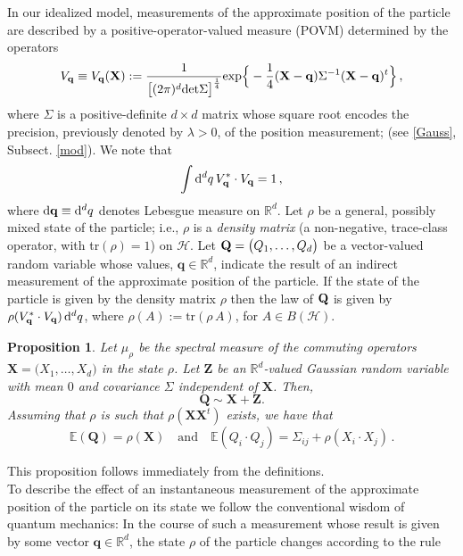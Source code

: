 \documentclass[11pt]{article}
\newtheorem{proposition}[theorem]{Proposition}
\renewcommand{\d}{{\mathrm d}}
\begin{document}
In our idealized model, measurements of the approximate position of the particle are described by a 
positive-operator-valued measure (POVM) determined by the operators
\begin{equation}\label{POVM1}
V_{\bf{q}}\equiv V_{\mathbf{q}}(\mathbf{X})  := \frac{1}{\big[(2\pi)^{d} \text{det}\Sigma\big]^{\frac{1}{4}}} \text{exp}\Big\{-\frac{1}{4}({\bf{X}}-{\bf{q}}) \Sigma^{-1}({\bf{X}}- {\bf{q}})^{t} \Big\}  \,,
\end{equation}
where $\Sigma$ is a positive-definite $d\times d$ matrix whose square root encodes the precision, previously denoted by $\lambda > 0$, of the position measurement; (see \eqref{Gauss}, Subsect. \ref{mod}).
We note that 
\begin{equation}\label{POVM}
\int \d^{d}{q} \, V_{\bf{q}}^{*}\cdot V_{\bf{q}} = 1\,,
\end{equation}
where $\d{\bf{q}} \equiv \d^{d}q$ denotes Lebesgue measure on $\mathbb{R}^{d}$. Let $\rho$ be a general, possibly mixed state of the particle; i.e., $\rho$ is a \textit{density matrix} (a non-negative, trace-class operator, 
with tr$(\rho)=1$) on $\mathcal{H}$. Let ${\bf{Q}}=\big(Q_1, \dots, Q_d \big)$ be a vector-valued random variable whose values, 
$\mathbf{q} \in \mathbb{R}^{d}$, indicate
the result of an indirect measurement of the approximate position of the particle. If the state of the particle is given by the density matrix
$\rho$ then the law of ${\bf{Q}}$ is given by $\rho(V_{\bf{q}}^{*}\cdot V_{\bf{q}})\,\d^{d}q$, where $\rho(A):= \text{tr}(\rho\,A)$,
for $A\in B(\mathcal{H})$.

\begin{proposition}\label{prop:law_Q_0}
	Let $\mu_\rho$ be the spectral measure of the commuting operators $\mathbf X=\big(X_1,\dots,X_d\big)$ in 
	the state $\rho$. 
	Let $\mathbf{Z}$ be an $\mathbb R^d$-valued Gaussian random variable with mean $0$ and covariance $\Sigma$ independent of $\mathbf{X}$. Then,
	$$\mathbf Q\sim \mathbf X+\mathbf Z.$$
Assuming that $\rho$ is such that $\rho(\mathbf{XX}^t)$ exists, we have that
\begin{equation}
\label{3}
\mathbb E(\mathbf Q) = \rho(\mathbf X)\quad \text{and} \quad \mathbb{E}(Q_i \cdot Q_j)=\Sigma_{ij} +
 \rho(X_i\cdot X_j)\,.
\end{equation}
\end{proposition}
This proposition follows immediately from the definitions.\\
To describe the effect of an instantaneous measurement of the approximate position of the particle on its state we 
follow the conventional wisdom of quantum mechanics: In the course of such a measurement whose result is given 
by some vector $\mathbf{q}\in \mathbb{R}^{d}$, the state $\rho$ of the particle changes according to the rule
\end{document}
